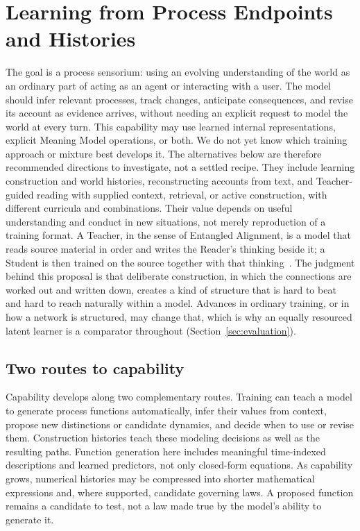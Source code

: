 \documentclass[10pt]{article}
\begin{document}
\section{Learning from Process Endpoints and Histories}
\label{sec:learning}

The goal is a process sensorium: using an evolving understanding of the world
as an ordinary part of acting as an agent or interacting with a user. The model
should infer relevant processes, track changes, anticipate consequences, and
revise its account as evidence arrives, without needing an explicit request
to model the world at every turn. This capability may use learned internal
representations, explicit Meaning Model operations, or both. We do not yet
know which training approach or mixture best develops it. The alternatives
below are therefore recommended directions to investigate, not a settled
recipe. They include learning construction and world histories, reconstructing
accounts from text, and Teacher-guided reading with supplied context,
retrieval, or active construction, with different curricula and combinations.
Their value depends on useful understanding and conduct in new situations,
not merely reproduction of a training format.
A Teacher, in the sense of Entangled Alignment, is a model that reads source material in
order and writes the Reader's thinking beside it; a Student is then trained on the source
together with that thinking~\cite{westerbergEntangled2026}.
The judgment behind this proposal is that deliberate construction, in which the
connections are worked out and written down, creates a kind of structure that is hard
to beat and hard to reach naturally within a model. Advances in ordinary training, or
in how a network is structured, may change that, which is why an equally resourced
latent learner is a comparator throughout (Section~\ref{sec:evaluation}).

\subsection{Two routes to capability}
\label{sec:two-routes}

Capability develops along two complementary routes. Training can teach a
model to generate process functions automatically, infer their values from
context, propose new distinctions or candidate dynamics, and decide when to
use or revise them. Construction histories teach these modeling decisions as
well as the resulting paths. Function generation here includes meaningful
time-indexed descriptions and learned predictors, not only closed-form
equations. As capability grows, numerical histories may be compressed into
shorter mathematical expressions and, where supported, candidate governing
laws. A proposed function remains a candidate to test, not a law made
true by the model's ability to generate it.
\end{document}
